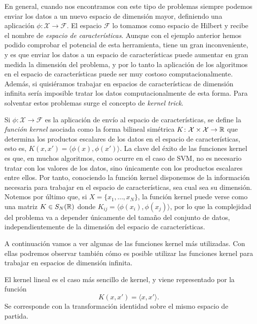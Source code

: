 En general, cuando nos encontramos con este tipo de problemas siempre podemos enviar los datos a un nuevo espacio de dimensión mayor, definiendo una aplicación $\phi\colon \mathcal{X} \to \mathcal{F}$. El espacio $\mathcal{F}$ lo tomamos como espacio de Hilbert y recibe el nombre de \emph{espacio de características}. Aunque con el ejemplo anterior hemos podido comprobar el potencial de esta herramienta, tiene un gran inconveniente, y es que enviar los datos a un espacio de características puede aumentar en gran medida la dimensión del problema, y por lo tanto la aplicación de los algoritmos en el espacio de características puede ser muy costoso computacionalmente. Además, si quisiéramos trabajar en espacios de características de dimensión infinita sería imposible tratar los datos computacionalmente de esta forma. Para solventar estos problemas surge el concepto de \emph{kernel trick}.

Si $\phi\colon \mathcal{X} \to \mathcal{F}$ es la aplicación de envío al espacio de características, se define la \emph{función kernel} asociada como la forma bilineal simétrica $K \colon \mathcal{X} \times \mathcal{X} \to \mathbb{R}$ que determina los productos escalares de los datos en el espacio de características, esto es,
$K(x,x') = \langle \phi(x), \phi(x') \rangle$. La clave del éxito de las funciones kernel es que, en muchos algoritmos, como ocurre en el caso de SVM, no es necesario tratar con los valores de los datos, sino únicamente con los productos escalares entre ellos. Por tanto, conociendo la función kernel disponemos de la información necesaria para trabajar en el espacio de características, sea cual sea su dimensión. Notemos por último que, si $X = \{x_1,\dots,x_N\}$, la función kernel puede verse como una matriz $K \in S_N(\mathbb{R})$ donde $K_{ij} = \langle \phi(x_i), \phi(x_j) \rangle$, por lo que la complejidad del problema va a depender únicamente del tamaño del conjunto de datos, independientemente de la dimensión del espacio de características.

A continuación vamos a ver algunas de las funciones kernel más utilizadas. Con ellas podremos observar también cómo es posible utilizar las funciones kernel para trabajar en espacios de dimensión infinita.

\begin{ex}
    El kernel lineal es el caso más sencillo de kernel, y viene representado por la función
    \[ K(x,x') = \langle x, x' \rangle. \]
    Se corresponde con la transformación identidad sobre el mismo espacio de partida.
\end{ex}

